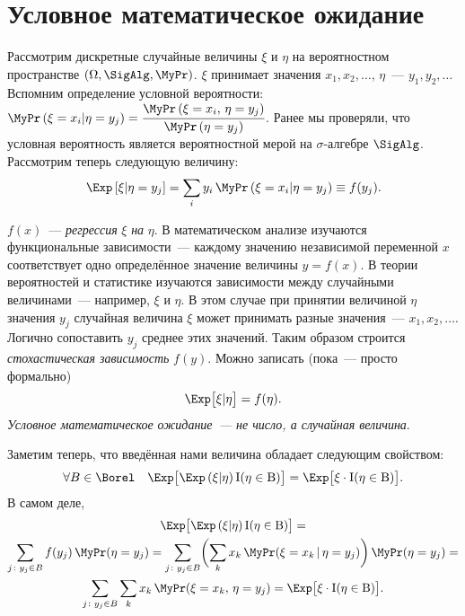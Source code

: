 \section{Условное математическое ожидание}
    Рассмотрим дискретные случайные величины $\xi$ и $\eta$ на вероятностном пространстве $(\Omega, \SigAlg, \MyPr)$. 
    $\xi$ принимает значения $x_1, x_2, \dots$, $\eta$~--- $y_1, y_2, \dots$
    Вспомним определение условной вероятности: ${\MyPr\left( \xi = x_i | \eta = y_j \right) = \cfrac{\MyPr\left( \xi = x_i, \, \eta = y_j\right)}{\MyPr\left(\eta = y_j\right)}}$.
    Ранее мы проверяли, что условная вероятность является вероятностной мерой на $\sigma$-алгебре $\SigAlg$.
    Рассмотрим теперь следующую величину:
    \begin{equation}
        \Exp \left[ \xi | \eta = y_j \right] = 
        \sum\limits_i y_i \, \MyPr\left(\xi = x_i | \eta = y_j \right) \equiv
        f(y_j).
        \label{cond_exp:discrete}
    \end{equation}
    
    $f(x)$~--- \textit{регрессия} $\xi$ \textit{на} $\eta$. 
    В математическом анализе изучаются функциональные зависимости~--- каждому значению независимой переменной $x$ соответствует одно определённое значение величины $y = f(x)$.
    В теории вероятностей и статистике изучаются зависимости между случайными величинами~--- например, $\xi$ и $\eta$.
    В этом случае при принятии величиной $\eta$ значения $y_j$ случайная величина $\xi$ может принимать разные значения~--- $x_1, x_2, \ldots$.
    Логично сопоставить $y_j$ среднее этих значений.
    Таким образом строится \textit{стохастическая зависимость} $f(y)$.
    Можно записать (пока~--- просто формально)
    \begin{equation*}
        \Exp \bigl[\xi | \eta \bigr] = f(\eta).
    \end{equation*}
    \textit{Условное математическое ожидание~--- не число, а случайная величина}.
    
    Заметим теперь, что введённая нами величина обладает следующим свойством:
    \begin{equation*}
        \forall B \in \Borel \quad \Exp \bigl[ \Exp \left( \xi | \eta\right) \rm{I}(\eta \in B)\bigr] = 
        \Exp \bigl[ \xi \cdot \rm{I}(\eta \in B) \bigr].
    \end{equation*}
    В самом деле,
    \begin{gather*}
        \Exp \bigl[ \Exp \left( \xi | \eta\right) \rm{I}(\eta \in B)\bigr] = \\
        \sum\limits_{j \colon y_j \in B} f(y_j) \, \MyPr(\eta = y_j) = 
        \sum\limits_{j \colon y_j \in B} \biggl( \sum\limits_k x_k \, \MyPr(\xi = x_k \,|\, \eta = y_j) \biggr) \, \MyPr(\eta = y_j) = \\
        \sum\limits_{j \colon y_j \in B} \sum\limits_k x_k \, \MyPr(\xi = x_k, \, \eta = y_j) = 
        \Exp \bigl[ \xi \cdot \rm{I}(\eta \in B)\bigr].
    \end{gather*}

